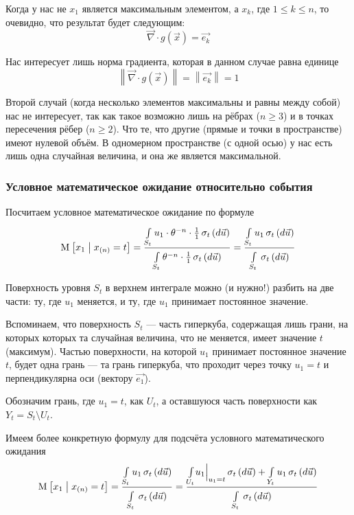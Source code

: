 Когда у нас не $x_1$ является максимальным элементом, а $x_k$,
где $1 \le k \le n$, то очевидно, что результат будет следующим:
$$\vec{\nabla} \cdot g\left( \vec{x} \right) = \vec{e_k}$$

Нас интересует лишь норма градиента, которая в данном случае равна единице
$$\left\| \vec{\nabla} \cdot g\left( \vec{x} \right) \right\|
    = \left\| \vec{e_k} \right\| = 1$$

Второй случай (когда несколько элементов максимальны и равны между собой)
нас не интересует, так как такое возможно лишь на рёбрах ($n \ge 3$) и в точках
пересечения рёбер ($n \ge 2$).
Что те, что другие (прямые и точки в пространстве) имеют нулевой объём.
В одномерном пространстве (с одной осью) у нас есть лишь одна
случайная величина, и она же является максимальной.

\subsubsection{Условное математическое ожидание относительно события}
Посчитаем условное математическое ожидание по формуле
\begin{align*}
    \Mean{x_1 \mcond x_{\left( n \right)} = t}
        = \frac{\integrall{S_t}{
                    \sigma_{t}\left(d\vec{u} \right)}{
                    u_1 \cdot \theta^{-n} \cdot \frac{1}{1}}}
                {\integrall{S_t}{\sigma_{t}\left(d\vec{u} \right)}{
                    \theta^{-n} \cdot \frac{1}{1}}}
        = \frac{\integrall{S_t}{
                    \sigma_{t}\left(d\vec{u} \right)}{u_1}}{
                \integrall{S_t}{
                    \sigma_{t}\left(d\vec{u} \right)}{}}
\end{align*}

Поверхность уровня $S_t$ в верхнем интеграле можно (и нужно!)
разбить на две части: ту, где $u_1$ меняется, и ту, где $u_1$
принимает постоянное значение.

Вспоминаем, что поверхность $S_t$ --- часть гиперкуба,
содержащая лишь грани, на которых которых та случайная величина,
что не меняется, имеет значение $t$ (максимум).
Частью поверхности, на которой $u_1$ принимает постоянное значение $t$,
будет одна грань --- та грань гиперкуба, что проходит через точку $u_1 = t$
и перпендикулярна оси (вектору $\vec{e_1}$).

Обозначим грань, где $u_1 = t$, как $U_t$,
а оставшуюся часть поверхности как $Y_t = S_t \setminus U_t$.

Имеем более конкретную формулу для подсчёта условного математического ожидания
\begin{align*}
    \Mean{x_1 \mcond x_{\left( n \right)} = t}
    = \frac{\integrall{S_t}{\sigma_{t}\left(d\vec{u} \right)}{u_1}}{
        \integrall{S_t}{\sigma_{t}\left(d\vec{u} \right)}{}}
    = \frac{\integrall{U_t}{\sigma_{t}\left(d\vec{u} \right)}{
                \Bigl. u_1 \Bigr|_{u_1 = t}}
            + \integrall{Y_t}{\sigma_{t}\left(d\vec{u} \right)}{
                u_1}}{
        \integrall{S_t}{\sigma_{t}\left(d\vec{u} \right)}{}}
\end{align*}


